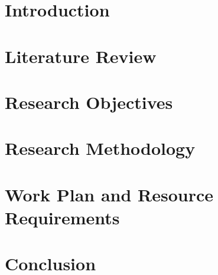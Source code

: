 \documentclass[a4paper,oneside,12pt]{report}
\begin{document}
	



\setlength{\parskip}{1em}



\clearpage


\setlength{\parskip}{1em}



\setlength{\parindent}{5mm}
\normalsize
{}

\tableofcontents
{}
\clearpage


\setlength{\parindent}{5mm}
\normalsize
{}


\chapter{Introduction}
\label{ch:introduction}



\chapter{Literature Review}
\label{ch:litearurereview}



\chapter{Research Objectives}
\label{ch:researchobjectives}



\chapter{Research Methodology}
\label{ch:researchmethodology}



\chapter{Work Plan and Resource Requirements}
\label{ch:workplanandresourcerequirements}



\chapter{Conclusion}
\label{ch:conlusion}



\renewcommand{\bibname}{\normalfont\selectfont\normalsize References}


\renewcommand{\bibname}{whatever}
\end{document}
